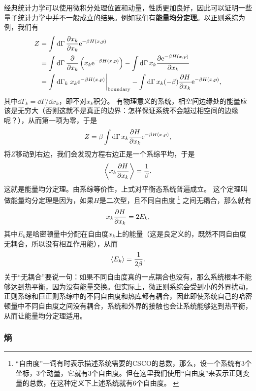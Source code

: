 \documentclass[hyperref, UTF8, a4paper]{ctexart}
\newcommand*{\ee}{\mathrm{e}}
\begin{document}
经典统计力学可以使用微积分处理位置和动量，性质更加良好，因此可以证明一些量子统计力学中并不一般成立的结果。例如我们有\textbf{能量均分定理}。以正则系综为例，我们有
\[
    \begin{aligned}
        Z &= \int \dd{\Gamma} \pdv{x_k}{x_k} \ee^{- \beta H(x, p)} \\
        &= \int \dd{\Gamma} \pdv{x_k} \left(x_k \ee^{- \beta H(x, p)}\right) - \int \dd{\Gamma} x_k \pdv{\ee^{- \beta H(x, p)}}{x_k} \\
        &= \int \dd{\Gamma_k} \eval{x_k \ee^{- \beta H(x, p)}}_\text{boundary} - \int \dd{\Gamma} x_k ( - \beta) \pdv{H}{x_k} \ee^{- \beta H(x, p)},
    \end{aligned}
\]
其中$\dd{\Gamma_k}=\dd{\Gamma}/\dd{x_k}$，即不对$x_k$积分。
有物理意义的系统，相空间边缘处的能量应该是无穷大（否则这就不是真正的边界：怎样保证系统不会越过相空间的边缘呢？），从而第一项为零，于是
\[
    Z = \beta \int \dd{\Gamma} x_k \pdv{H}{x_k} \ee^{-\beta H(x, p)},
\] 
将$Z$移动到右边，我们会发现方程右边正是一个系综平均，于是
\begin{equation}
    \expval{x_k \pdv{H}{x_k}} = \frac{1}{\beta}.
\end{equation}
这就是能量均分定理。由系综等价性，上式对平衡态系统普遍成立。
这个定理叫做能量均分定理是因为，如果$H$是二次型，且不同自由度%
\footnote{“自由度”一词有时表示描述系统需要的CSCO的总数，那么，设一个系统有3个坐标，3个动量，它就有3个自由度。但在这里我们使用“自由度”来表示正则变量的总数，在这种定义下上述系统就有6个自由度。
\label{note:degree-of-freedom-counting}
}%
之间无耦合，那么就有
\[
    x_k \pdv{H}{x_k} = 2 E_k,
\]
其中$E_k$是哈密顿量中分配在自由度$x_k$上的能量（这是良定义的，既然不同自由度无耦合，所以没有相互作用能），从而
\begin{equation}
    \expval{E_k} = \frac{1}{2\beta}.
\end{equation}
关于“无耦合”要说一句：如果不同自由度真的一点耦合也没有，那么系统根本不能够达到热平衡，因为没有能量交换。但实际上，微正则系综会受到小的外界扰动，正则系综和巨正则系综中的不同自由度和热库都有耦合，因此即使系统自己的哈密顿量中不同自由度之间没有耦合，系统和外界的接触也会让系统能够达到热平衡，从而让能量均分定理适用。

\subsubsection{熵}
\end{document}
